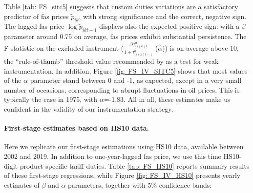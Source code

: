 \documentclass[a4paper,11pt]{article}
\begin{document}

Table \ref{tab: FS_sitc5} suggests that custom duties variations are a satisfactory predictor of fas prices $\widetilde{p}_{ik}$, with strong significance and the correct, negative sign. The lagged fas price $\log \widetilde{p}_{ikt-1}$ displays also the expected positive sign: with a $\beta$ parameter around 0.75 on average, fas prices exhibit substantial persistence. The F-statistic on the excluded instrument ($\frac{\Delta \tau^d_{is(k)t}}{1+\tau_{is(k)t-1}^d}$ ($\widehat{\alpha}$)) is on average above 10, the ``rule-of-thumb'' threshold value recommended by \cite{staiger_stock} as a test for weak instrumentation. In addition, Figure \ref{fig: FS_IV_SITC5} shows that most values of the $\alpha$ parameter stand between 0 and -1, as expected, except in a very small number of occasions, corresponding to abrupt fluctuations in oil prices. This is typically the case in 1975, with $\alpha$=-1.83. All in all, these estimates make us confident in the validity of our instrumentation strategy.



\paragraph{First-stage estimates based on HS10 data.}

Here we replicate our first-stage estimations using HS10 data, available between 2002 and 2019. In addition to one-year-lagged fas price, we use this time HS10-digit product-specific tariff duties. Table \ref{tab: FS_HS10} reports summary results of these first-stage regressions, while Figure \ref{fig: FS_IV_HS10} presents yearly estimates of $\beta$ and $\alpha$ parameters, together with 5\% confidence bands:
\end{document}
